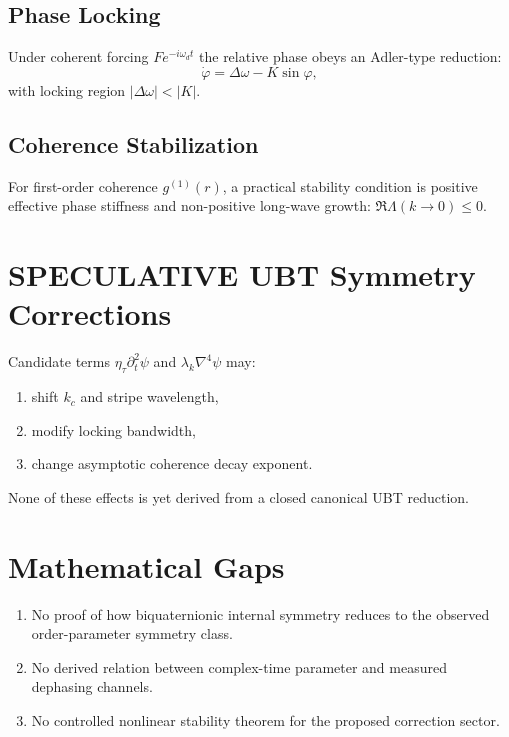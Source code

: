 \documentclass[11pt,a4paper]{article}
\begin{document}
\subsection{Phase Locking}
Under coherent forcing $F e^{-i\omega_d t}$ the relative phase obeys an Adler-type reduction:
\begin{equation}
\dot\varphi=\Delta\omega-K\sin\varphi,
\end{equation}
with locking region $|\Delta\omega|<|K|$.

\subsection{Coherence Stabilization}
For first-order coherence $g^{(1)}(r)$, a practical stability condition is positive effective phase stiffness and non-positive long-wave growth: $\Re\Lambda(k\to0)\le0$.

\section{SPECULATIVE UBT Symmetry Corrections}
Candidate terms $\eta_\tau\partial_t^2\psi$ and $\lambda_k\nabla^4\psi$ may:
\begin{enumerate}
\item shift $k_c$ and stripe wavelength,
\item modify locking bandwidth,
\item change asymptotic coherence decay exponent.
\end{enumerate}
None of these effects is yet derived from a closed canonical UBT reduction.

\section{Mathematical Gaps}
\begin{enumerate}
\item No proof of how biquaternionic internal symmetry reduces to the observed order-parameter symmetry class.
\item No derived relation between complex-time parameter and measured dephasing channels.
\item No controlled nonlinear stability theorem for the proposed correction sector.
\end{enumerate}
\end{document}
